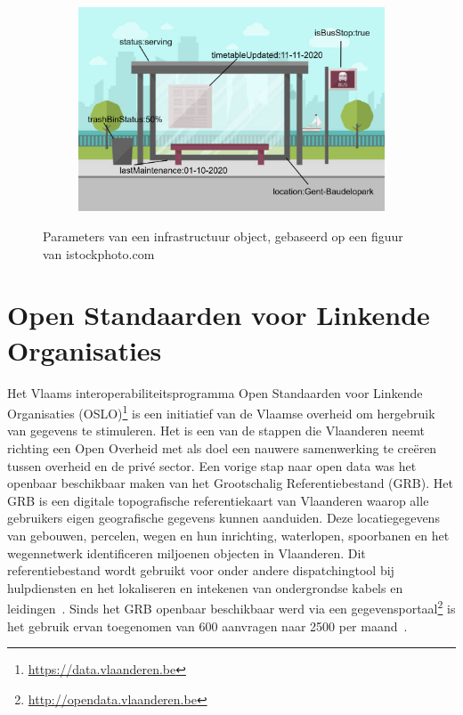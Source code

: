 \begin{figure}[h]
	\centering
	\begin{subfigure}{\textwidth}
		\centering
		\centerline{
			\includegraphics[scale=0.35]{images/busstation_labels.png}
		}
	\end{subfigure}
	\caption{Parameters van een infrastructuur object, gebaseerd op een figuur van istockphoto.com}
	\label{fig:busstation_labels}
\end{figure}

\section{Open Standaarden voor Linkende Organisaties}
\label{sec:OSLO}
Het Vlaams interoperabiliteitsprogramma Open Standaarden voor Linkende Organisaties (OSLO)\footnote{\url{https://data.vlaanderen.be}} is een initiatief van de Vlaamse overheid om hergebruik van gegevens te stimuleren. Het is een van de stappen die Vlaanderen neemt richting een Open Overheid met als doel een nauwere samenwerking te creëren tussen overheid en de privé sector.
Een vorige stap naar open data was het openbaar beschikbaar maken van het Grootschalig Referentiebestand (GRB). Het GRB is een digitale topografische referentiekaart van Vlaanderen waarop alle gebruikers eigen geografische gegevens kunnen aanduiden. Deze locatiegegevens van gebouwen, percelen, wegen en hun inrichting, waterlopen, spoorbanen en het wegennetwerk identificeren miljoenen objecten in Vlaanderen. Dit referentiebestand wordt gebruikt voor onder andere dispatchingtool bij hulpdiensten en het lokaliseren en intekenen van ondergrondse kabels en leidingen~\cite{wat_is_grb}. Sinds het GRB openbaar beschikbaar werd via een gegevensportaal\footnote{\url{http://opendata.vlaanderen.be}} is het gebruik ervan toegenomen van 600 aanvragen naar 2500 per maand~\cite{grb_OD}.

